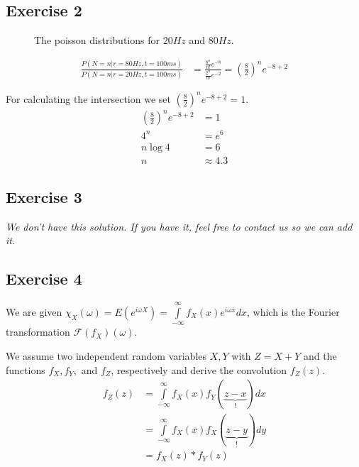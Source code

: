 \documentclass[../main/Notes.tex]{subfiles}
\begin{document}
\subsection*{Exercise 2}
\begin{figure}
  \caption{The poisson distributions for $20 Hz$ and $80 Hz$.}
  \label{fig:2014-06-30_ex2distri}
\end{figure}

\begin{align*}
\frac{P(N=n|r=80 Hz, t = 100 ms)}{P(N=n|r=20 Hz, t = 100 ms)} &= \frac{ \frac{8^n}{n!}e^{-8} }{ \frac{2^n}{n!} e^{-2} } = \left(\frac{8}{2}\right)^n e^{-8+2}
\end{align*}

For calculating the intersection we set $\left(\frac{8}{2}\right)^n e^{-8+2} = 1$.
\begin{align*}
\left(\frac{8}{2}\right)^n e^{-8+2} &= 1\\
                                4^n &= e^6 \\
                           n \log 4 &= 6 \\
                                  n &\approx 4.3
\end{align*}

\subsection*{Exercise 3}
\emph{We don't have this solution. If you have it, feel free to contact us so we can add it.}

\subsection*{Exercise 4}
We are given
$\chi_X(\omega) = E(e^{i\omega X})= \int\limits_{-\infty}^\infty f_X(x)e^{i\omega x} dx$, which is the Fourier transformation $\mathcal{F}(f_X)(\omega)$.

We assume two independent random variables $X, Y$ with $Z=X+Y$ and the functions $f_X, f_Y,$ and $f_Z$, respectively and derive the convolution $f_Z(z)$.
\begin{align*}
f_Z(z) &= \int\limits_{-\infty}^\infty f_X(x)f_Y(\underbrace{z-x}_{!})dx \\
       &= \int\limits_{-\infty}^\infty f_X(x)f_X(\underbrace{z-y}_{!})dy \\
       &= f_X(z) * f_Y(z)
\end{align*}
\end{document}
